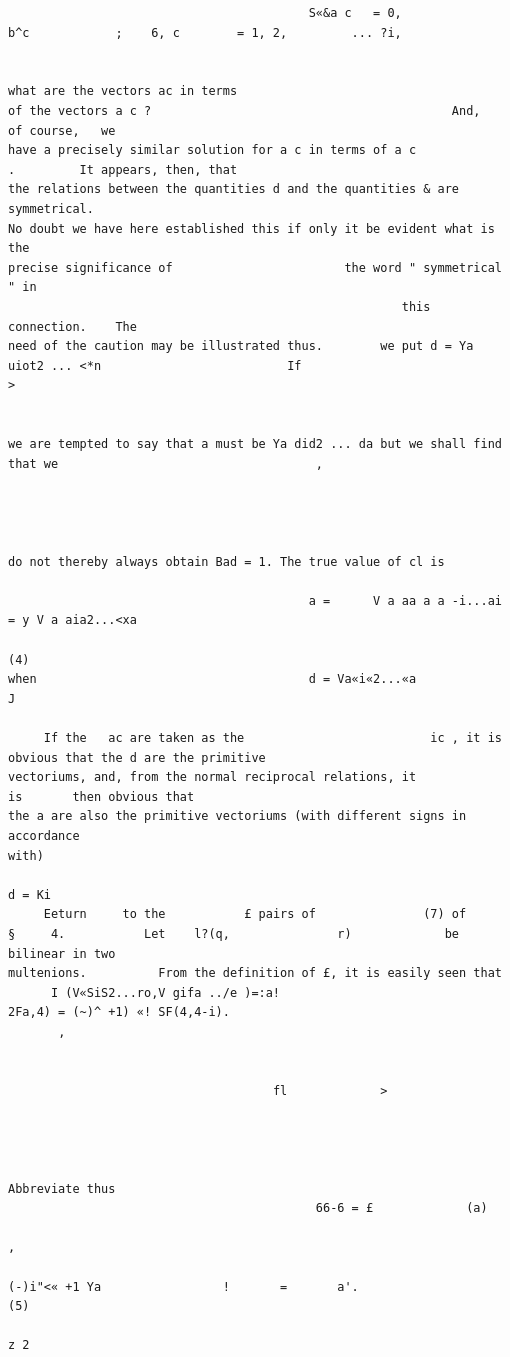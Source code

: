 \documentclass[10pt]{article}
\begin{document}
\begin{verbatim}
                                          S«&a c   = 0,               b^c            ;    6, c        = 1, 2,         ... ?i,


what are the vectors ac in terms                                          of the vectors a c ?                                          And,     of course,   we
have a precisely similar solution for a c in terms of a c                                                                .         It appears, then, that
the relations between the quantities d and the quantities & are symmetrical.
No doubt we have here established this if only it be evident what is the
precise significance of                        the word " symmetrical " in
                                                       this connection.    The
need of the caution may be illustrated thus.        we put d = Ya uiot2 ... <*n                          If                                                       >


we are tempted to say that a must be Ya did2 ... da but we shall find that we                                    ,




do not thereby always obtain Bad = 1. The true value of cl is

                                          a =      V a aa a a -i...ai               = y V a aia2...<xa
                                                                                                                                                              (4)
when                                      d = Va«i«2...«a                                                                    J

     If the   ac are taken as the                          ic , it is                obvious that the d are the primitive
vectoriums, and, from the normal reciprocal relations, it                                                                           is       then obvious that
the a are also the primitive vectoriums (with different signs in accordance
with)
                                                                      d = Ki
     Eeturn     to the           £ pairs of               (7) of               §     4.           Let    l?(q,               r)             be bilinear in two
multenions.          From the definition of £, it is easily seen that
      I (V«SiS2...ro,V gifa ../e )=:a!                                    2Fa,4) = (~)^ +1) «! SF(4,4-i).
       ,


                                     fl             >




Abbreviate thus
                                           66-6 = £             (a)
                                                                      ,
                                                                               (-)i"<« +1 Ya                 !       =       a'.                              (5)
                                                                                                                                                    z 2


\end{verbatim}
\end{document}
